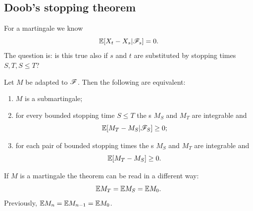 \documentclass{report}
\begin{document}
\subsection{Doob’s stopping theorem}
For a martingale we know
\[\mathbb{E}[X_{t}-X_{s}|\mathscr{F}_{s}]=0.\]
The question is: is this true also if $s$ and $t$ are substituted by stopping times $S,T,S\leq T$?
\begin{theorem}
	Let $M$ be adapted to $\mathscr{F}$. Then the following are equivalent:
	\begin{enumerate}[\circnum]
		\item $M$ is a submartingale;
		\item for every bounded stopping time $S\leq T$ the \rv s $M_{S}$ and $M_{T}$ are integrable and 
		\[\mathbb{E}[M_{T}-M_{S}|\mathscr{F}_{S}]\geq0;\]
		\item for each pair of bounded stopping times the \rv s $M_{S}$ and $M_{T}$ are integrable and 
		\[\mathbb{E}[M_{T}-M_{S}]\geq 0.\] 
	\end{enumerate}
\end{theorem}
\begin{remark}
	If $M$ is a martingale the theorem can be read in a different way:
	\begin{equation*}
		\mathbb{E} M_{T}=\mathbb{E} M_{S}=\mathbb{E} M_{0}.
	\end{equation*}
	Previously, $\mathbb{E} M_{n}=\mathbb{E} M_{n-1}=\mathbb{E} M_{0}$.
\end{remark}
\end{document}
